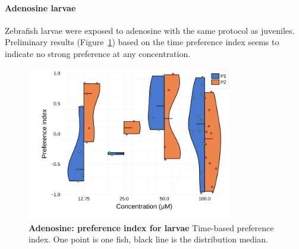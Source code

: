     \paragraph{Adenosine larvae} Zebrafish larvae were exposed to adenosine with the same protocol as juveniles. Preliminary results (Figure~\ref{dist_adenosine_lar}) based on the time preference index seems to indicate no strong preference at any concentration.
  \begin{figure}[h!]
      \centering
      \includegraphics[width=0.8\textwidth]{part_2/assets/dist_adenosine_lar.png}
      \caption{\textbf{Adenosine: preference index for larvae} Time-based preference index. One point is one fish, black line is the distribution median.}
      \label{dist_adenosine_lar}
    \end{figure}

